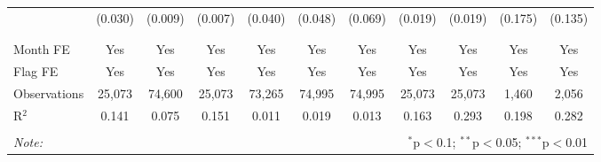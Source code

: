 \begin{table}[H]
\begin{tabular}{@{\extracolsep{1pt}}lcccccccccc}
  & (0.030) & (0.009) & (0.007) & (0.040) & (0.048) & (0.069) & (0.019) & (0.019) & (0.175) & (0.135) \\ 
  & & & & & & & & & & \\ 
\hline \\[-1.8ex] 
Month FE & Yes & Yes & Yes & Yes & Yes & Yes & Yes & Yes & Yes & Yes \\ 
Flag FE & Yes & Yes & Yes & Yes & Yes & Yes & Yes & Yes & Yes & Yes \\ 
Observations & 25,073 & 74,600 & 25,073 & 73,265 & 74,995 & 74,995 & 25,073 & 25,073 & 1,460 & 2,056 \\ 
R$^{2}$ & 0.141 & 0.075 & 0.151 & 0.011 & 0.019 & 0.013 & 0.163 & 0.293 & 0.198 & 0.282 \\ 
\hline 
\hline \\[-1.8ex] 
\textit{Note:}  & \multicolumn{10}{r}{$^{*}$p$<$0.1; $^{**}$p$<$0.05; $^{***}$p$<$0.01} \\ 
\end{tabular} 
\end{table} 
